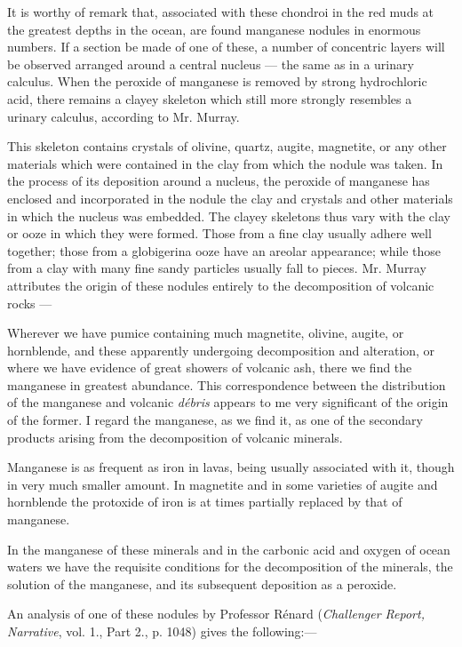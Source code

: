 \documentclass[a4paper, 12pt, oneside, polutonikogreek, english]{article}
\begin{document}
It is worthy of remark that, associated with these chondroi in the red muds at the greatest depths in the ocean, are found manganese nodules in enormous numbers. If a section be made of one of these, a number of concentric layers will be observed arranged around a central nucleus --- the same as in a urinary calculus. When the peroxide of manganese is removed by strong hydrochloric acid, there remains a clayey skeleton which still more strongly resembles a urinary calculus, according to Mr. Murray.

This skeleton contains crystals of olivine, quartz, augite, magnetite, or any other materials which were contained in the clay from which the nodule was taken. In the process of its deposition around a nucleus, the peroxide of manganese has enclosed and incorporated in the nodule the clay and crystals and other materials in which the nucleus was embedded. The clayey skeletons thus vary with the clay or ooze in which they were formed. Those from a fine clay usually adhere well together; those from a globigerina ooze have an areolar appearance; while those from a clay with many fine sandy particles usually fall to pieces. Mr. Murray attributes the origin of these nodules entirely to the decomposition of volcanic rocks ---

Wherever we have pumice containing much magnetite, olivine, augite, or hornblende, and these apparently undergoing decomposition and alteration, or where we have evidence of great showers of volcanic ash, there we find the manganese in greatest abundance. This correspondence between the distribution of the manganese and volcanic \emph{débris} appears to me very significant of the origin of the former. I regard the manganese, as we find it, as one of the secondary products arising from the decomposition of volcanic minerals.

Manganese is as frequent as iron in lavas, being usually associated with it, though in very much smaller amount. In magnetite and in some varieties of augite and hornblende the protoxide of iron is at times partially replaced by that of manganese.

In the manganese of these minerals and in the carbonic acid and oxygen of ocean waters we have the requisite conditions for the decomposition of the minerals, the solution of the manganese, and its subsequent deposition as a peroxide.

An analysis of one of these nodules by Professor Rénard (\emph{Challenger Report, Narrative}, vol. 1., Part 2., p. 1048) gives the following:---
\end{document}
